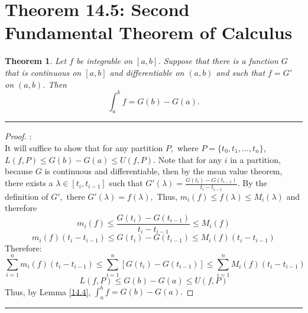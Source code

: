 \documentclass[openany, amssymb, psamsfonts]{amsart}
\newtheorem{thm}{Theorem}[section]
\theoremstyle{definition}
\numberwithin{equation}{section}
\begin{document}
\section*{Theorem 14.5: Second Fundamental Theorem of Calculus}
\begin{thm} 
\label{14.5}
	Let $f$ be integrable on $[a, b]$. Suppose that there is a function $G$ that is continuous on $[a, b]$ and differentiable on $(a, b)$ and such that $f = G'$ on $(a, b)$. Then
	\[
		\int_{a}^{b} f = G(b) - G(a).
	\]
\end{thm}
\vspace{4pt}     \hrule   \vspace{4pt}\begin{proof}:\\
    It will suffice to show that for any partition $P,$ where $P = \{t_0, t_1, \dots, t_n\}$, $L(f,P)\leq G(b) - G(a)\leq U(f,P).$ Note that for any $i$ in a partition, because $G$ is continuous and differentiable, then by the mean value theorem, there exists a $\lambda \in [t_i, t_{i-1}]$ such that $G'(\lambda) = \frac{G(t_{i}) - G(t_{i-1})}{t_{i} - t_{i-1}}.$ By the definition of $G',$ there $G'(\lambda) = f(\lambda),$ Thus, $m_i(f)\leq f(\lambda) \leq M_i(\lambda)$ and therefore \[m_i(f)\leq \frac{G(t_i) - G(t_{i-1})}{t_i - t_{i-1}}\leq M_i(f)\]
    \[m_i(f)(t_i - t_{i-1}) \leq G(t_i) - G(t_{i-1}) \leq M_i(f)(t_i - t_{i-1})\]
    Therefore:
    \[\sum_{i=1}^nm_i(f)(t_i - t_{i-1}) \leq \sum_{i=1}^n[G(t_i) - G(t_{i-1})] \leq \sum_{i=1}^nM_i(f)(t_i - t_{i-1})\]
    \[L(f,P)\leq G(b) - G(a) \leq U(f,P)\]
    Thus, by Lemma \ref{14.4}, $\int_a^bf = G(b) - G(a).$
\end{proof} \vspace{4pt}     \hrule   \vspace{4pt}
\end{document}
